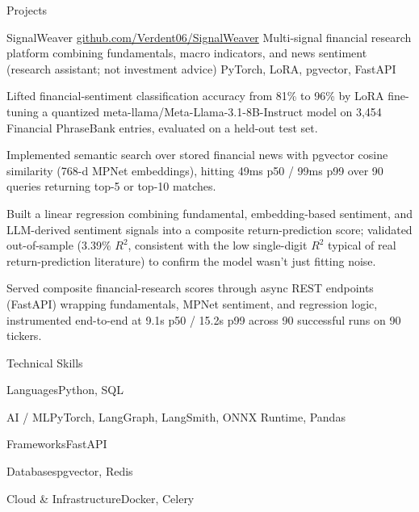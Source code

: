 \documentclass[
	11pt
]{../../../template}
\begin{document}
	\begin{rSection}{P}{rojects}
		\begin{rSectionEntry}
			{SignalWeaver}
			{\href{https://github.com/Verdent06/SignalWeaver}{github.com/Verdent06/SignalWeaver}}
			{Multi-signal financial research platform combining fundamentals, macro indicators, and news sentiment (research assistant; not investment advice)}
			{PyTorch, LoRA, pgvector, FastAPI}
			{}

			\item Lifted financial-sentiment classification accuracy from 81\% to 96\% by LoRA fine-tuning a quantized meta-llama/Meta-Llama-3.1-8B-Instruct model on 3,454 Financial PhraseBank entries, evaluated on a held-out test set.
			\item Implemented semantic search over stored financial news with pgvector cosine similarity (768-d MPNet embeddings), hitting 49ms p50 / 99ms p99 over 90 queries returning top-5 or top-10 matches.
			\item Built a linear regression combining fundamental, embedding-based sentiment, and LLM-derived sentiment signals into a composite return-prediction score; validated out-of-sample (3.39\% $R^{2}$, consistent with the low single-digit $R^{2}$ typical of real return-prediction literature) to confirm the model wasn't just fitting noise.
			\item Served composite financial-research scores through async REST endpoints (FastAPI) wrapping fundamentals, MPNet sentiment, and regression logic, instrumented end-to-end at 9.1s p50 / 15.2s p99 across 90 successful runs on 90 tickers.
		\end{rSectionEntry}
	\end{rSection}

	\begin{rSection}{T}{echnical Skills}
		\begin{rSet}{Languages}{Python, SQL}
		\end{rSet}
		\begin{rSet}{AI / ML}{PyTorch, LangGraph, LangSmith, ONNX Runtime, Pandas}
		\end{rSet}
		\begin{rSet}{Frameworks}{FastAPI}
		\end{rSet}
		\begin{rSet}{Databases}{pgvector, Redis}
		\end{rSet}
		\begin{rSet}{Cloud \& Infrastructure}{Docker, Celery}
		\end{rSet}
	\end{rSection}
\end{document}
